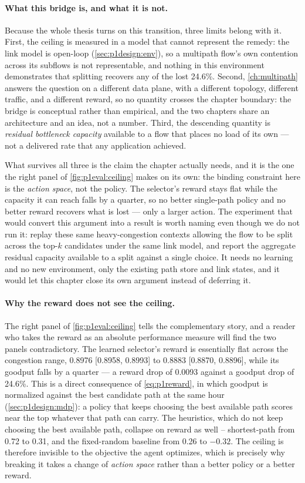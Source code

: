 \paragraph{What this bridge is, and what it is not.} Because the whole thesis turns on this transition,
three limits belong with it. First, the ceiling is measured in a model that cannot represent the remedy: the link model is
open-loop (\cref{sec:p1design:env}), so a multipath flow's own contention across its subflows is not
representable, and nothing in this environment demonstrates that splitting recovers any of the lost
24.6\%. Second, \cref{ch:multipath} answers the question on a different data plane, with a different
topology, different traffic, and a different reward, so no quantity crosses the chapter boundary: the
bridge is conceptual rather than empirical, and the two chapters share an architecture and an idea, not a
number. Third, the descending quantity is \emph{residual bottleneck capacity} available to a flow that
places no load of its own --- not a delivered rate that any application achieved.

What survives all three is the claim the chapter actually needs, and it is the one the right panel of
\cref{fig:p1eval:ceiling} makes on its own: the binding constraint here is the \emph{action space}, not
the policy. The selector's reward stays flat while the capacity it can reach falls by a quarter, so no
better single-path policy and no better reward recovers what is lost --- only a larger action. The
experiment that would convert this argument into a result is worth naming even though we do not run it:
replay these same heavy-congestion contexts allowing the flow to be split across the top-$k$ candidates
under the same link model, and report the aggregate residual capacity available to a split against a
single choice. It needs no learning and no new environment, only the existing path store and link
states, and it would let this chapter close its own argument instead of deferring it.

\paragraph{Why the reward does not see the ceiling.} The right panel of \cref{fig:p1eval:ceiling} tells
the complementary story, and a reader who takes the reward as an absolute performance measure will find
the two panels contradictory. The learned selector's reward is
essentially flat across the congestion range, 0.8976 [0.8958, 0.8993] to 0.8883 [0.8870, 0.8896], while
its goodput falls by a quarter --- a reward drop of 0.0093 against a goodput drop of 24.6\%. This
is a direct consequence of \cref{eq:p1reward}, in which goodput is normalized against the best candidate
path at the same hour (\cref{sec:p1design:mdp}): a policy that keeps choosing the best available path
scores near the top whatever that path can carry. The heuristics, which do not keep choosing the best
available path, collapse on reward as well -- shortest-path from 0.72 to 0.31, and the fixed-random
baseline from 0.26 to $-0.32$. The ceiling is therefore invisible to the objective the agent optimizes,
which is precisely why breaking it takes a change of \emph{action space} rather than a better policy or a
better reward.


